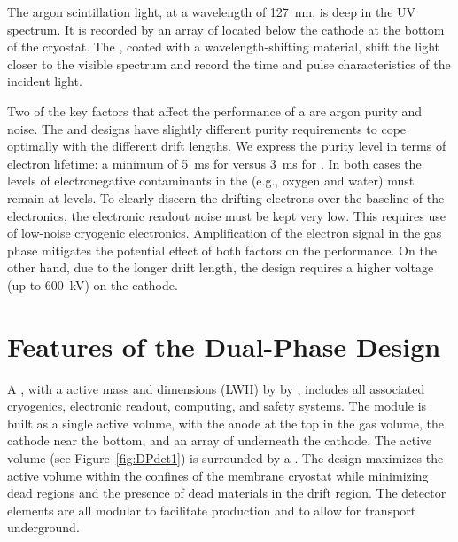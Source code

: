 The argon scintillation light, at a wavelength of  \SI{127}{nm}, is deep in the UV spectrum. It is recorded by an array of  located below the cathode at the bottom of the cryostat.  The , coated with a wavelength-shifting material, shift the light closer to the visible spectrum and record the time and pulse characteristics of the incident light.

Two of the key factors that affect the performance of a  are argon purity and noise.  The  and  designs have slightly different purity requirements to cope optimally with the different drift lengths. We express the purity level in terms of electron lifetime: a minimum of \SI{5}{ms} for  versus \SI{3}{ms} for . In both cases the levels of electronegative contaminants in the  (e.g., oxygen and water) must remain 
at  levels.  
To clearly discern the drifting electrons over the baseline of the electronics, the   electronic readout noise must be kept very low. This requires use of low-noise cryogenic electronics. 
Amplification of the electron signal in the gas phase mitigates the potential effect of both factors on the performance.  On the other hand, due to the longer drift length, the  design requires a higher voltage (up to \SI{600}{kV}) on the cathode. 



\section{Features of the Dual-Phase Design}
\label{sec:dp-execsum-description}

A , with a  \dpactivelarmass{} active mass  and dimensions (LWH) \dptpclen by \dptpcwdth by \tpcheight{}, includes all associated cryogenics, electronic readout, computing, and safety systems. The module is built as a single active volume, with the anode at the top in the gas volume, the cathode near the bottom, and an array of  underneath the cathode. The active volume (see Figure~\ref{fig:DPdet1}) is surrounded by a . 
The  design maximizes the active volume within the confines of the membrane cryostat while minimizing dead regions and the presence of dead materials in the drift region.  The detector elements are all modular to facilitate production and to allow for transport underground.



